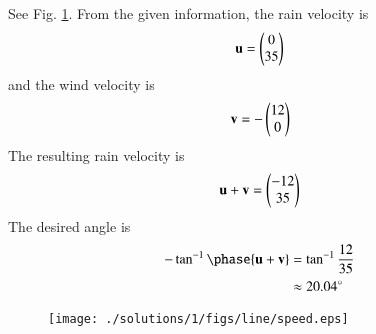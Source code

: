 %
See Fig. \ref{fig:3.8.1_speed}.  From the given information,  the rain velocity is
\begin{align}
\mathbf{u} = \begin{pmatrix}0\\35\end{pmatrix}
\end{align}
%
and the wind velocity is 
\begin{align}
\mathbf{v} = -\begin{pmatrix}12\\0\end{pmatrix}
\end{align}
%
The resulting rain velocity is 
\begin{align}
\mathbf{u}+\mathbf{v} = \begin{pmatrix}-12\\35\end{pmatrix}
\end{align}
The desired angle is 
\begin{align}
-\tan^{-1}\phase{\vec{u}+\vec{v}} &= \tan^{-1}\frac{12}{35}
\\
&\approx 20.04 \degree
\end{align}  
\begin{figure}[!ht]
\texttt{[image: ./solutions/1/figs/line/speed.eps]}
\caption{}
\label{fig:3.8.1_speed}
\end{figure}
